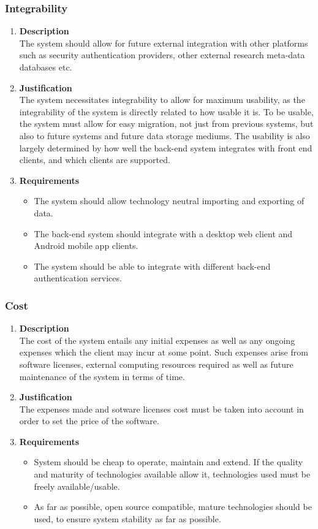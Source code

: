 \documentclass[a4paper,10pt]{article}
\begin{document}
\subsubsection{Integrability}
\begin{enumerate}
\item \textbf{Description} \\
The system should allow for future external integration with other platforms such as security authentication providers, other external research meta-data databases etc.
\item \textbf{Justification} \\
The system necessitates integrability to allow for maximum usability, as the integrability of the system is directly related to how usable it is. To be usable, the system must allow for easy migration, not just from previous systems, but also to future systems and future data storage mediums. The usability is also largely determined by how well the back-end system integrates with front end clients, and which clients are supported.
\item \textbf{Requirements}
	\begin{itemize}
		\item The system should allow technology neutral importing and exporting of data.
		\item The back-end system should integrate with a desktop web client and Android mobile app clients.
		\item The system should be able to integrate with different back-end authentication services.
	\end{itemize}
\end{enumerate}

\subsubsection{Cost}
\begin{enumerate}
\item \textbf{Description} \\
The cost of the system entails any initial expenses as well as any ongoing expenses which the client may incur at some point. Such expenses arise from software licenses, external computing resources required as well as future maintenance of the system in terms of time.
\item \textbf{Justification} \\
The expenses made and sotware licenses cost must be taken into account in order to set the price of the software.
\item \textbf{Requirements}
	\begin{itemize}
		\item System should be cheap to operate, maintain and extend. If the quality and maturity of technologies available allow it, technologies used must be freely available/usable.
		\item As far as possible, open source compatible, mature technologies should be used, to ensure system stability as far as possible.
	\end{itemize}
\end{enumerate}
\end{document}
